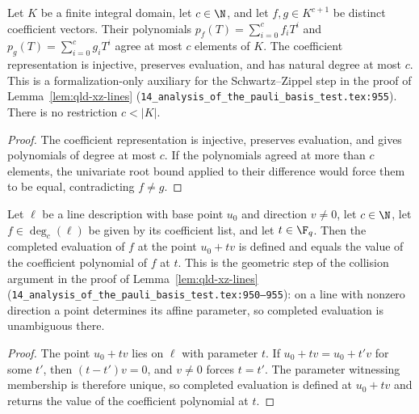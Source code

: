 \begin{lemma}
	\label{lem:coefficient-polynomial-agreement}
	\leanok
	Let $K$ be a finite integral domain, let $c\in\N$, and let
	$f,g\in K^{c+1}$ be distinct coefficient vectors. Their polynomials
	$p_f(T)=\sum_{i=0}^{c}f_iT^i$ and $p_g(T)=\sum_{i=0}^{c}g_iT^i$
	agree at most $c$ elements of $K$.
	The coefficient representation is injective, preserves evaluation,
	and has natural degree at most $c$.
	This is a formalization-only auxiliary for the Schwartz--Zippel step
	in the proof of Lemma~\ref{lem:qld-xz-lines}
	(\texttt{14\_analysis\_of\_the\_pauli\_basis\_test.tex:955}).
	There is no restriction $c<|K|$.
\end{lemma}
\begin{proof}
	\leanok
	The coefficient representation is injective, preserves evaluation,
	and gives polynomials of degree at most $c$. If the polynomials agreed
	at more than $c$ elements, the univariate root bound applied to their
	difference would force them to be equal, contradicting $f\ne g$.
\end{proof}

\begin{lemma}
	\label{lem:affine-line-evaluation}
	\leanok
	Let $\ell$ be a line description with base point $u_0$ and direction
	$v \neq 0$, let $c \in \N$, let $f \in \deg_{c}(\ell)$ be given by its
	coefficient list, and let $t \in \F_q$. Then the completed evaluation of
	$f$ at the point $u_0 + t v$ is defined and equals the value of the
	coefficient polynomial of $f$ at $t$.
	This is the geometric step of the collision argument in the proof of
	Lemma~\ref{lem:qld-xz-lines}
	(\texttt{14\_analysis\_of\_the\_pauli\_basis\_test.tex:950--955}): on a
	line with nonzero direction a point determines its affine parameter, so
	completed evaluation is unambiguous there.
\end{lemma}
\begin{proof}
	\leanok
	The point $u_0 + t v$ lies on $\ell$ with parameter $t$. If
	$u_0 + t v = u_0 + t' v$ for some $t'$, then $(t - t')v = 0$, and
	$v \neq 0$ forces $t = t'$. The parameter witnessing membership is
	therefore unique, so completed evaluation is defined at $u_0 + t v$ and
	returns the value of the coefficient polynomial at $t$.
\end{proof}

